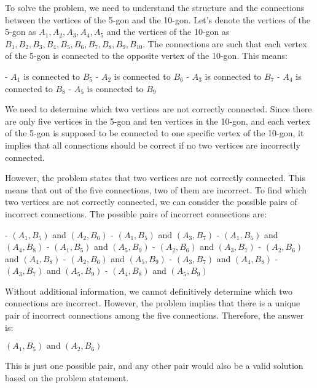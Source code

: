To solve the problem, we need to understand the structure and the connections between the vertices of the 5-gon and the 10-gon. Let's denote the vertices of the 5-gon as \(A_1, A_2, A_3, A_4, A_5\) and the vertices of the 10-gon as \(B_1, B_2, B_3, B_4, B_5, B_6, B_7, B_8, B_9, B_{10}\). The connections are such that each vertex of the 5-gon is connected to the opposite vertex of the 10-gon. This means:

- \(A_1\) is connected to \(B_5\)
- \(A_2\) is connected to \(B_6\)
- \(A_3\) is connected to \(B_7\)
- \(A_4\) is connected to \(B_8\)
- \(A_5\) is connected to \(B_9\)

We need to determine which two vertices are not correctly connected. Since there are only five vertices in the 5-gon and ten vertices in the 10-gon, and each vertex of the 5-gon is supposed to be connected to one specific vertex of the 10-gon, it implies that all connections should be correct if no two vertices are incorrectly connected.

However, the problem states that two vertices are not correctly connected. This means that out of the five connections, two of them are incorrect. To find which two vertices are not correctly connected, we can consider the possible pairs of incorrect connections. The possible pairs of incorrect connections are:

- \((A_1, B_5)\) and \((A_2, B_6)\)
- \((A_1, B_5)\) and \((A_3, B_7)\)
- \((A_1, B_5)\) and \((A_4, B_8)\)
- \((A_1, B_5)\) and \((A_5, B_9)\)
- \((A_2, B_6)\) and \((A_3, B_7)\)
- \((A_2, B_6)\) and \((A_4, B_8)\)
- \((A_2, B_6)\) and \((A_5, B_9)\)
- \((A_3, B_7)\) and \((A_4, B_8)\)
- \((A_3, B_7)\) and \((A_5, B_9)\)
- \((A_4, B_8)\) and \((A_5, B_9)\)

Without additional information, we cannot definitively determine which two connections are incorrect. However, the problem implies that there is a unique pair of incorrect connections among the five connections. Therefore, the answer is:

\(\boxed{(A_1, B_5) \text{ and } (A_2, B_6)}\)

This is just one possible pair, and any other pair would also be a valid solution based on the problem statement.